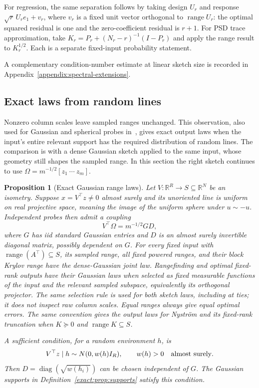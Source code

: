 \documentclass[11pt,a4paper]{article}
\newtheorem{proposition}[theorem]{Proposition}
\theoremstyle{definition}\newtheorem{definition}[theorem]{Definition}
\theoremstyle{remark}\newtheorem{remark}[theorem]{Remark}
\numberwithin{equation}{section}
\newcommand{\R}{\mathbb R}\newcommand{\E}{\mathbb E}\newcommand{\Pp}{\mathbb P}
\DeclareMathOperator{\range}{range}\DeclareMathOperator{\diag}{diag}
\begin{document}
For regression, the same separation follows by taking design $U_r$
and response $\sqrt r\,U_re_1+v_r$, where $v_r$ is a fixed unit vector
orthogonal to $\range U_r$: the optimal squared residual is one and
the zero-coefficient residual is $r+1$. For PSD trace approximation,
take $K_r=P_r+(N_r-r)^{-1}(I-P_r)$ and apply the range result to
$K_r^{1/2}$. Each is a separate fixed-input probability statement.

A complementary condition-number estimate at linear sketch size
is recorded in Appendix~\ref{appendix:spectral-extensions}.

\subsection{Exact laws from random lines}
Nonzero column scales leave sampled ranges unchanged. This observation,
also used for Gaussian and spherical probes in~\cite[Section~5.4]{CEMT2025},
gives exact output laws when the input's entire relevant support has the
required distribution of random lines. The comparison is with a dense
Gaussian sketch applied to the same input, whose geometry still shapes
the sampled range. In this section the right sketch continues to use
$\Omega=m^{-1/2}[z_1\ \cdots\ z_m]$.
\begin{proposition}[Exact Gaussian range laws]\label{exact:thm:projective}
Let $V:\R^R\to S\subseteq\R^N$ be an isometry. Suppose
$x=V^\top z\ne0$ almost surely and its unoriented line is uniform
on real projective space, meaning the image of the uniform sphere under
$u\sim-u$. Independent probes then admit a coupling
\begin{equation}\label{exact:eq:projective-coupling}
 V^\top\Omega=m^{-1/2}GD,
\end{equation}
where $G$ has iid standard Gaussian entries and $D$ is an almost surely
invertible diagonal matrix, possibly dependent on $G$.
For every fixed input with $\range(A^\top)\subseteq S$, its sampled
range, all fixed powered ranges, and their block Krylov range have the
dense-Gaussian joint law. Rangefinding and optimal fixed-rank outputs
have their Gaussian laws when selected as fixed measurable functions
of the input and the relevant sampled subspace, equivalently its
orthogonal projector. The same selection rule is used for both sketch
laws, including at ties; it does not inspect raw column scales. Equal
ranges always give equal optimal errors. The same convention gives
the output laws for Nystr\"om and its fixed-rank truncation when
$K\succeq0$ and $\range K\subseteq S$.

A sufficient condition, for a random environment $h$, is
\begin{equation}\label{exact:eq:conditional}
 V^\top z\mid h\sim N(0,w(h)I_R),\qquad w(h)>0
 \quad\hbox{almost surely}.
\end{equation}
Then $D=\diag(\sqrt{w(h_i)})$ can be chosen independent of $G$.
The Gaussian supports in Definition~\ref{exact:prop:supports} satisfy
this condition.
\end{proposition}
\end{document}

